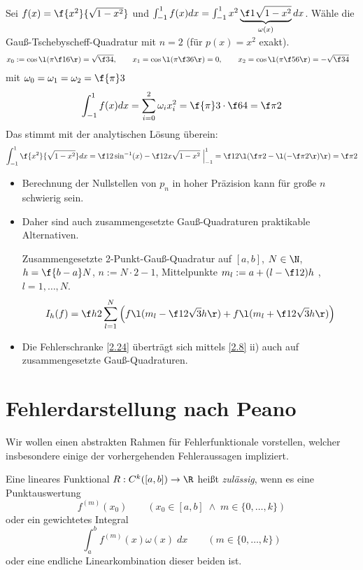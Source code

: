 \documentclass[11pt]{scrbook}
\begin{document}
\begin{ex*}
	Sei $f(x) = \f {x^2}{\sqrt{1-x^2}}$ und $\int_{-1}^1 f(x) dx = \int_{-1}^1 x^2 \underbrace{\f 1{\sqrt{1-x^2}}}_{\omega(x)} dx$.
	Wähle die Gauß-Tschebyscheff-Quadratur mit $n=2$ (für $p(x) = x^2$ exakt).
	\begin{align*}
		x_0 := \cos\l(\pi \f 16 \r) = \sqrt{\f 34}, \qquad x_1 &= \cos\l(\pi \f 36\r) = 0, \qquad x_2 = \cos \l(\pi\f 56\r) = -\sqrt{\f 34}
	\end{align*}
	mit $\omega_0 = \omega_1 = \omega_2 = \f {\pi}3$
	\[
		\int_{-1}^1 f(x) dx = \sum_{i=0}^2 \omega_i x_i^2 = \f {\pi}3 \cdot \f 64 = \f \pi2
	\]
	Das stimmt mit der analytischen Lösung überein:
	\[
		\int_{-1}^1 \f {x^2}{\sqrt{1-x^2}} dx = \f 12 \sin^{-1}(x) - \f 12 x\sqrt{1-x^2} \; \Big|_{-1}^1 = \f 12 \l( \f \pi 2 - \l(-\f \pi 2\r) \r) = \f \pi2
	\]
\end{ex*}

\begin{nt*}
	\begin{itemize}
		\item
			Berechnung der Nullstellen von $p_n$ in hoher Präzision kann für große $n$ schwierig sein.
		\item
			Daher sind auch zusammengesetzte Gauß-Quadraturen praktikable Alternativen.
			\begin{ex*}
				Zusammengesetzte 2-Punkt-Gauß-Quadratur auf $[a,b]$, $N\in \N$, $h=\f {b-a}N$, $n:= N\cdot 2 - 1$, Mittelpunkte $m_l := a+ (l-\f 12)h$ , $l= 1,\dotsc, N$.
				\[
					I_h (f) = \f h2 \sum_{l=1}^N \Big( f\l(m_l- \f 1{2\sqrt 3} h\r) + f\l( m_l + \f 1{2\sqrt 3} h\r) \Big)
				\]
			\end{ex*}
		\item
			Die Fehlerschranke \ref{2.24} überträgt sich mittels \ref{2.8} ii) auch auf zusammengesetzte Gauß-Quadraturen.
	\end{itemize}
\end{nt*}


\section{Fehlerdarstellung nach Peano}

Wir wollen einen abstrakten Rahmen für Fehlerfunktionale vorstellen, welcher insbesondere einige der vorhergehenden Fehleraussagen impliziert.

\begin{df}
	\label{2.27}
	Eine lineares Funktional $R : C^k([a,b]) \to \R$ heißt \emph{zulässig}, wenn es eine Punktauswertung 
	\[
		f^{(m)}(x_0)
		\qquad (x_0\in [a,b] \;\land\; m\in \{0,\dotsc,k\})
	\]
	oder ein gewichtetes Integral
	\[
		\int_a^b f^{(m)}(x) \omega(x) \; dx
		\qquad (m \in \{0,\dotsc,k\})
	\]
	oder eine endliche Linearkombination dieser beiden ist.
\end{df}
\end{document}
